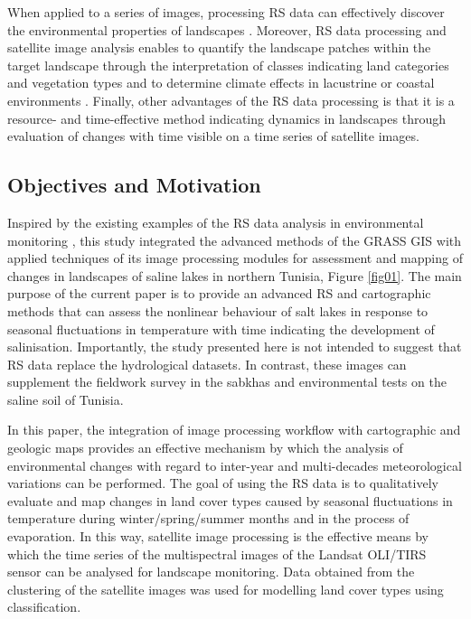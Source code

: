 \documentclass[environments,article,submit,pdftex,moreauthors]{Definitions/mdpi}
\begin{document}
When applied to a series of images, processing RS data can effectively discover the environmental properties of  landscapes \cite{Toujani,Quarmby,Gelebo}. Moreover, RS data processing and satellite image analysis enables to quantify the landscape patches within the target landscape through the interpretation of classes indicating land categories and vegetation types \cite{Benedetti,Godinho} and to determine climate effects in lacustrine or coastal environments \cite{Souissi}. Finally, other advantages of the RS data processing is that it is a resource- and time-effective method indicating dynamics in landscapes through evaluation of changes with time visible on a time series of satellite images. 

\subsection{Objectives and Motivation}

Inspired by the existing examples of the RS data analysis in environmental monitoring \cite{f9020059,Lemenkova202229,Fathalli,Abbas,Henchiri}, this study integrated the advanced methods of the GRASS GIS with applied techniques of its image processing modules for assessment and mapping of changes in landscapes of saline lakes in northern Tunisia, Figure \ref{fig01}. The main purpose of the current paper is to provide an advanced RS and cartographic methods that can assess the nonlinear behaviour of salt lakes in response to seasonal fluctuations in temperature with time indicating the development of salinisation. Importantly, the study presented here is not intended to suggest that RS data replace the hydrological datasets. In contrast, these images can supplement the fieldwork survey in the sabkhas and environmental tests on the saline soil of Tunisia. 

In this paper, the integration of image processing workflow with cartographic and geologic maps  provides an effective mechanism by which the analysis of environmental changes with regard to inter-year and multi-decades meteorological variations can be performed. The goal of using the RS data is to qualitatively evaluate and map changes in land cover types caused by seasonal fluctuations in temperature during winter/spring/summer months and in the process of evaporation. In this way, satellite image processing is the effective means by which the time series of the multispectral images of the Landsat OLI/TIRS sensor can be analysed for landscape monitoring. Data obtained from the clustering of the satellite images was used for modelling land cover types using classification. 
\end{document}
